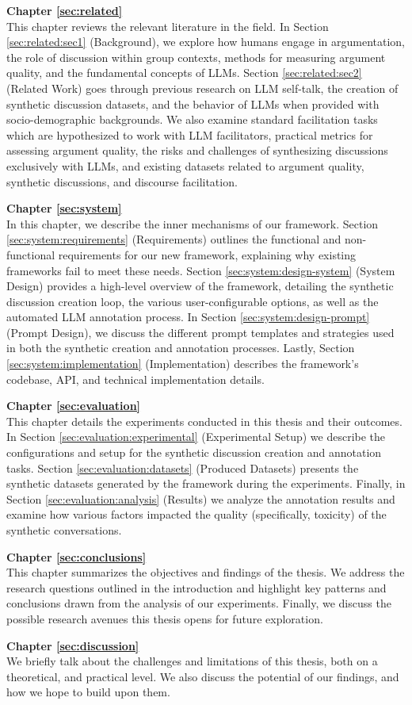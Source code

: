 \textbf{Chapter \ref{sec:related}} \\[0.2em]
This chapter reviews the relevant literature in the field. In Section \ref{sec:related:sec1} (Background), we explore how humans engage in argumentation, the role of discussion within group contexts, methods for measuring argument quality, and the fundamental concepts of \acp{LLM}. Section \ref{sec:related:sec2} (Related Work) goes through previous research on LLM self-talk, the creation of synthetic discussion datasets, and the behavior of LLMs when provided with socio-demographic backgrounds. We also examine standard facilitation tasks which are hypothesized to work with LLM facilitators, practical metrics for assessing argument quality, the risks and challenges of synthesizing discussions exclusively with LLMs, and existing datasets related to argument quality, synthetic discussions, and discourse facilitation.


\textbf{Chapter \ref{sec:system}} \\[0.2em]
In this chapter, we describe the inner mechanisms of our framework. Section \ref{sec:system:requirements} (Requirements) outlines the functional and non-functional requirements for our new framework, explaining why existing frameworks fail to meet these needs. Section \ref{sec:system:design-system} (System Design) provides a high-level overview of the framework, detailing the synthetic discussion creation loop, the various user-configurable options, as well as the automated LLM annotation process. In Section \ref{sec:system:design-prompt} (Prompt Design), we discuss the different prompt templates and strategies used in both the synthetic creation and annotation processes. Lastly, Section \ref{sec:system:implementation} (Implementation) describes the framework's codebase, \ac{API}, and technical implementation details.

\textbf{Chapter \ref{sec:evaluation}} \\[0.2em]
This chapter details the experiments conducted in this thesis and their outcomes. In Section \ref{sec:evaluation:experimental} (Experimental Setup) we describe the configurations and setup for the synthetic discussion creation and annotation tasks. Section \ref{sec:evaluation:datasets} (Produced Datasets)  presents the synthetic datasets generated by the framework during the experiments.  Finally, in Section \ref{sec:evaluation:analysis} (Results) we analyze the annotation results and examine how various factors impacted the quality (specifically, toxicity) of the synthetic conversations.


\textbf{Chapter \ref{sec:conclusions}} \\[0.2em]
This chapter summarizes the objectives and findings of the thesis. We address the research questions outlined in the introduction and highlight key patterns and conclusions drawn from the analysis of our experiments. Finally, we discuss the possible research avenues this thesis opens for future exploration.

\textbf{Chapter \ref{sec:discussion}} \\[0.2em]
We briefly talk about the challenges and limitations of this thesis, both on a theoretical, and practical level. We also discuss the potential of our findings, and how we hope to build upon them.
